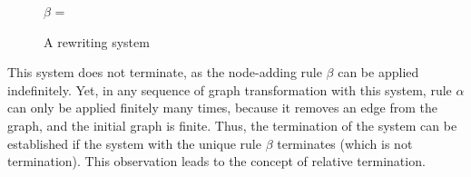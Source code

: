 \begin{figure}[!htbp]

        $\beta$ ={
        }
    \caption{A rewriting system}
    \label{fig:intro:edge_deletion_and_node_addition_rule}
  \end{figure}
  This system does not terminate, as the node-adding rule $\beta$ can be applied indefinitely. Yet, in any sequence of graph transformation with this system, rule $\alpha$ can only be applied finitely many times, because it removes an edge from the graph, and the initial graph is finite. Thus, the termination of the system can be established if the system with the unique rule $\beta$ terminates (which is not termination). This observation leads to the concept of relative termination.

